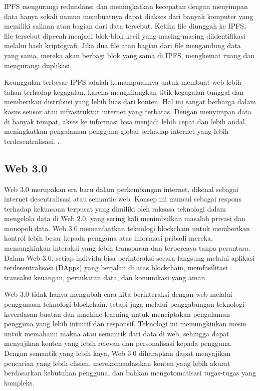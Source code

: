 IPFS mengurangi redundansi dan meningkatkan kecepatan dengan menyimpan data hanya sekali namun membuatnya dapat diakses dari banyak komputer yang memiliki salinan atau bagian dari data tersebut. Ketika file diunggah ke IPFS, file tersebut dipecah menjadi blok-blok kecil yang masing-masing diidentifikasi melalui hash kriptografi. Jika dua file atau bagian dari file mengandung data yang sama, mereka akan berbagi blok yang sama di IPFS, menghemat ruang dan mengurangi duplikasi.

Keunggulan terbesar IPFS adalah kemampuannya untuk membuat web lebih tahan terhadap kegagalan, karena menghilangkan titik kegagalan tunggal dan memberikan distribusi yang lebih luas dari konten. Hal ini sangat berharga dalam kasus sensor atau infrastruktur internet yang terbatas. Dengan menyimpan data di banyak tempat, akses ke informasi bisa menjadi lebih cepat dan lebih andal, meningkatkan pengalaman pengguna global terhadap internet yang lebih terdesentralisasi. \cite{Steichen18}.

\subsection{Web 3.0}
Web 3.0 merupakan era baru dalam perkembangan internet, dikenal sebagai internet desentralisasi atau semantic web. Konsep ini muncul sebagai respons terhadap kekuasaan terpusat yang dimiliki oleh raksasa teknologi dalam mengelola data di Web 2.0, yang sering kali menimbulkan masalah privasi dan monopoli data. Web 3.0 memanfaatkan teknologi blockchain untuk memberikan kontrol lebih besar kepada pengguna atas informasi pribadi mereka, memungkinkan interaksi yang lebih transparan dan terpercaya tanpa perantara. Dalam Web 3.0, setiap individu bisa berinteraksi secara langsung melalui aplikasi terdesentralisasi (DApps) yang berjalan di atas blockchain, memfasilitasi transaksi keuangan, pertukaran data, dan komunikasi yang aman. \cite{RAY2023213}

Web 3.0 tidak hanya mengubah cara kita berinteraksi dengan web melalui penggunaan teknologi blockchain, tetapi juga melalui penggabungan teknologi kecerdasan buatan dan machine learning untuk menciptakan pengalaman pengguna yang lebih intuitif dan responsif. Teknologi ini memungkinkan mesin untuk memahami makna atau semantik dari data di web, sehingga dapat menyajikan konten yang lebih relevan dan personalisasi kepada pengguna. Dengan semantik yang lebih kaya, Web 3.0 diharapkan dapat menyajikan pencarian yang lebih efisien, merekomendasikan konten yang lebih akurat berdasarkan kebutuhan pengguna, dan bahkan mengotomatisasi tugas-tugas yang kompleks. \cite{Chohan2022}

